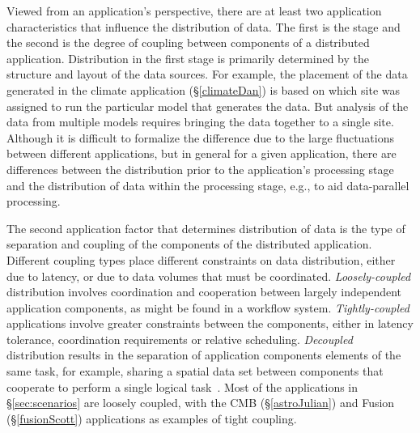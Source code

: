 Viewed from an application's perspective, there are at least two
application characteristics that influence the distribution of
data. The first is the stage and the second is the degree of coupling
between components of a distributed application. Distribution in the
first stage is primarily determined by the structure and layout of the
data sources. For example, the placement of the data generated in the
climate application (\S\ref{climateDan}) is based on which site was
assigned to run the particular model that generates the data. But
analysis of the data from multiple models requires bringing the data
together to a single site.  Although it is difficult to formalize the
difference due to the large fluctuations between different
applications, but in general for a given application, there are
differences between the distribution prior to the application's
processing stage and the distribution of data within the processing
stage, e.g., to aid data-parallel processing.


The second application factor that determines distribution of data is
the type of separation and coupling of the components of the
distributed application. Different coupling types place different
constraints on data distribution, either due to latency, or due to
data volumes that must be coordinated. %
\emph{Loosely-coupled} distribution involves coordination and
cooperation between largely independent application components, as
might be found in a workflow system. \emph{Tightly-coupled}
applications involve greater constraints between the components,
either in latency tolerance, coordination requirements or relative
scheduling. \emph{Decoupled} distribution results in the separation of
application components elements of the same task, for example, sharing
a spatial data set between components that cooperate to perform a
single logical task~\cite{dpa_surveypaper,thebookthatchangedtheworld}.
Most of the applications in \S\ref{sec:scenarios} are loosely coupled,
with the CMB (\S\ref{astroJulian}) and Fusion (\S\ref{fusionScott})
applications as examples of tight coupling.




